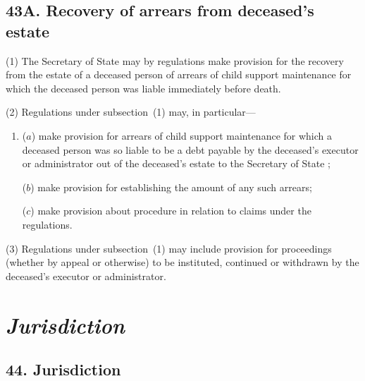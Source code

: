 \documentclass[12pt,a4paper]{article}
\begin{document}

\subsection{43A. Recovery of arrears from deceased's estate}

(1) The Secretary of State may by regulations make provision for the recovery from the estate of a deceased person of arrears of child support maintenance for which the deceased person was liable immediately before death.

(2) Regulations under subsection~(1) may, in particular---
\begin{enumerate}\item[]
($a$) make provision for arrears of child support maintenance for which a deceased person was so liable to be a debt payable by the deceased’s executor or administrator out of the deceased’s estate to the 
Secretary of State%
;

($b$) make provision for establishing the amount of any such arrears;

($c$) make provision about procedure in relation to claims under the regulations.
\end{enumerate}

(3) Regulations under subsection~(1) may include provision for proceedings (whether by appeal or otherwise) to be instituted, continued or withdrawn by the deceased’s executor or administrator.


\section{\itshape Jurisdiction}

\subsection{44. Jurisdiction}
\end{document}
